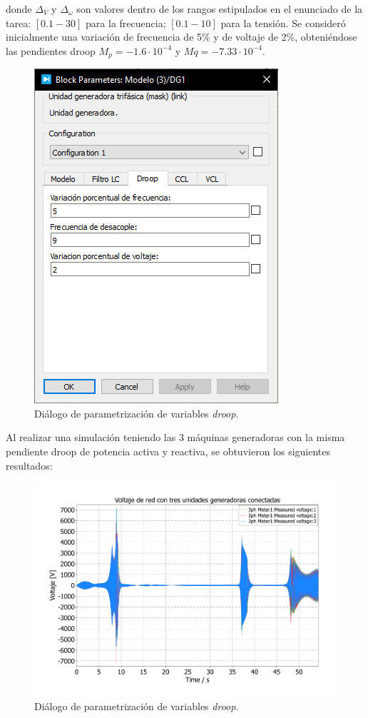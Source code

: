 donde $\Delta_V$ y $\Delta_\omega$ son valores dentro de los rangos estipulados en el enunciado de la tarea: $[0.1 - 30]$ para la frecuencia; $[0.1 - 10]$ para la tensión. Se consideró inicialmente una variación de frecuencia de 5\% y de voltaje de 2\%, obteniéndose las pendientes droop $M_p = -1.6\cdot 10^{-4}$ y $ Mq = -7.33 \cdot 10^{-4}$.\\

\begin{figure}
   \centering
   \includegraphics[width=0.5\linewidth]{Tarea 1/report/imagenes/p2a/dialogo_dg.png}
   \caption{Diálogo de parametrización de variables \textit{droop}.}
   \label{dialogo_dg}
\end{figure}

Al realizar una simulación teniendo las 3 máquinas generadoras con la misma pendiente droop de potencia activa y reactiva, se obtuvieron los siguientes resultados:

\begin{figure}
   \centering
   \includegraphics[width=0.5\linewidth]{Tarea 1/report/imagenes/p3a/resonancia_generadores.pdf}
   \caption{Diálogo de parametrización de variables \textit{droop}.}
   \label{resonancia_generadores}
\end{figure}

